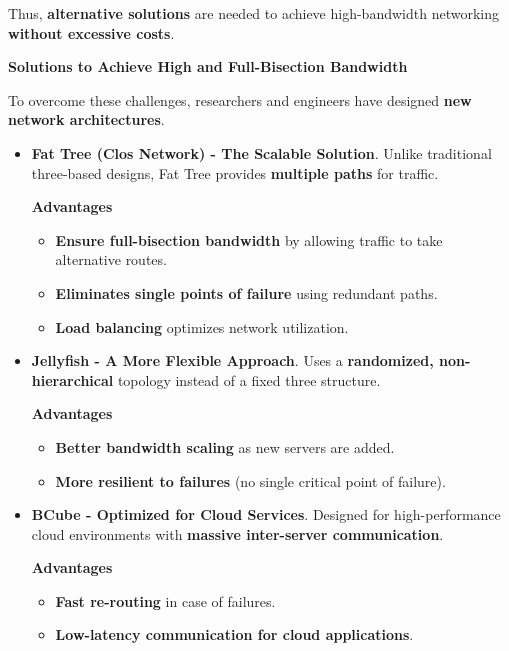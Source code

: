 Thus, \textbf{alternative solutions} are needed to achieve high-bandwidth networking \textbf{without excessive costs}.

\newpage

\begin{flushleft}
    \textcolor{Green3}{ \textbf{Solutions to Achieve High and Full-Bisection Bandwidth}}
\end{flushleft}
To overcome these challenges, researchers and engineers have designed \textbf{new network architectures}.
\begin{itemize}[label=\textcolor{Green3}{}]
    \item \textcolor{Green3}{\textbf{Fat Tree (Clos Network) - The Scalable Solution}}. Unlike traditional three-based designs, Fat Tree provides \textbf{multiple paths} for traffic.
    
    \textcolor{Green3}{ \textbf{Advantages}}
    \begin{itemize}[label=\textcolor{Green3}{}]
        \item \textbf{Ensure full-bisection bandwidth} by allowing traffic to take alternative routes.
        \item \textbf{Eliminates single points of failure} using redundant paths.
        \item \textbf{Load balancing} optimizes network utilization.
    \end{itemize}


    \item \textcolor{Green3}{\textbf{Jellyfish - A More Flexible Approach}}. Uses a \textbf{randomized, non-hierarchical} topology instead of a fixed three structure.

    \textcolor{Green3}{ \textbf{Advantages}}
    \begin{itemize}[label=\textcolor{Green3}{}]
        \item \textbf{Better bandwidth scaling} as new servers are added.
        \item \textbf{More resilient to failures} (no single critical point of failure).
    \end{itemize}


    \item \textcolor{Green3}{\textbf{BCube - Optimized for Cloud Services}}. Designed for high-performance cloud environments with \textbf{massive inter-server communication}.
    
    \textcolor{Green3}{ \textbf{Advantages}}
    \begin{itemize}[label=\textcolor{Green3}{}]
        \item \textbf{Fast re-routing} in case of failures.
        \item \textbf{Low-latency communication for cloud applications}.
    \end{itemize}
\end{itemize}

